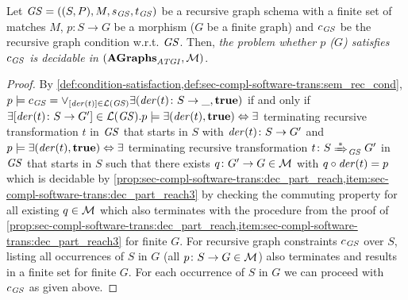 \begin{theorem}
\label{thm:sec-compl-software-trans:sat_rec_cond}
Let $\mathit{GS}=((S,P),M,s_\mathit{GS},t_\mathit{GS})$ be a recursive graph schema with a finite set of matches $M$, $p\colon S \to G$ be a morphism ($G$ be a finite graph) and $c_\mathit{GS}$ be the recursive graph condition w.r.t. $\mathit{GS}$.
Then, \emph{the problem whether $p$ ($G$) satisfies $c_\mathit{GS}$ is decidable in $\mathbf{(}\mathbf{AGraphs}_\mathit{ATGI},{\cal M})$}.
\envEndMarker
\end{theorem}

\begin{proof}
By \cref{def:condition-satisfaction,def:sec-compl-software-trans:sem_rec_cond}, $p \models c_\mathit{GS}=\vee_{[\mathit{der}(t)] \in \mathcal{L}(\mathit{GS})}\exists(\mathit{der}(t)\colon S \to \_,\textbf{true})$ if and only if $\exists [\mathit{der}(t)\colon S \to G'] \in \mathcal{L}(\mathit{GS}).p \models \exists(\mathit{der}(t),\textbf{true}) \Leftrightarrow \exists$ terminating recursive transformation $t$ in $\mathit{GS}$ that starts in $S$ with $\mathit{der}(t)\colon S \to G'$ and $p \models \exists(\mathit{der}(t),\textbf{true}) \Leftrightarrow\exists$ terminating recursive transformation $t\colon S \Trans{*}_\GS G'$ in $\mathit{GS}$ that starts in $S$ such that there exists $q\colon G' \to G \in {\cal M}$ with $q \circ \mathit{der}(t)=p$ which is decidable by \cref{prop:sec-compl-software-trans:dec_part_reach,item:sec-compl-software-trans:dec_part_reach3} by checking the commuting property for all existing $q \in {\cal M}$ which also terminates with the procedure from the proof of \cref{prop:sec-compl-software-trans:dec_part_reach,item:sec-compl-software-trans:dec_part_reach3} for finite $G$.
For recursive graph constraints $c_\mathit{GS}$ over $S$, listing all occurrences of $S$ in $G$ (all $p\colon S \to G \in {\cal M}$) also terminates and results in a finite set for finite $G$.
For each occurrence of $S$ in $G$ we can proceed with $c_\mathit{GS}$ as given above.
\end{proof}

